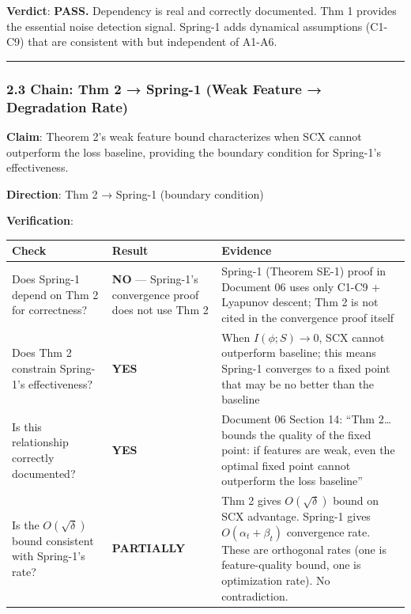 \documentclass[
  12pt,
]{article}
\begin{document}
\textbf{Verdict}: \textbf{PASS.} Dependency is real and correctly
documented. Thm 1 provides the essential noise detection signal.
Spring-1 adds dynamical assumptions (C1-C9) that are consistent with but
independent of A1-A6.

\begin{center}\rule{0.5\linewidth}{0.5pt}\end{center}

\subsubsection{2.3 Chain: Thm 2 → Spring-1 (Weak Feature → Degradation
Rate)}\label{chain-thm-2-spring-1-weak-feature-degradation-rate}

\textbf{Claim}: Theorem 2's weak feature bound characterizes when SCX
cannot outperform the loss baseline, providing the boundary condition
for Spring-1's effectiveness.

\textbf{Direction}: Thm 2 → Spring-1 (boundary condition)

\textbf{Verification}:

\begin{longtable}[]{@{}
  >{\raggedright\arraybackslash}p{}
  >{\raggedright\arraybackslash}p{}
  >{\raggedright\arraybackslash}p{}@{}}
\toprule\noalign{}
\begin{minipage}[b]{\linewidth}\raggedright
Check
\end{minipage} & \begin{minipage}[b]{\linewidth}\raggedright
Result
\end{minipage} & \begin{minipage}[b]{\linewidth}\raggedright
Evidence
\end{minipage} \\
\midrule\noalign{}
\endhead
\bottomrule\noalign{}
\endlastfoot
Does Spring-1 depend on Thm 2 for correctness? & \textbf{NO} ---
Spring-1's convergence proof does not use Thm 2 & Spring-1 (Theorem
SE-1) proof in Document 06 uses only C1-C9 + Lyapunov descent; Thm 2 is
not cited in the convergence proof itself \\
Does Thm 2 constrain Spring-1's effectiveness? & \textbf{YES} & When
\(I(\phi; S) \to 0\), SCX cannot outperform baseline; this means
Spring-1 converges to a fixed point that may be no better than the
baseline \\
Is this relationship correctly documented? & \textbf{YES} & Document 06
Section 14: ``Thm 2\ldots bounds the quality of the fixed point: if
features are weak, even the optimal fixed point cannot outperform the
loss baseline'' \\
Is the \(O(\sqrt{\delta})\) bound consistent with Spring-1's rate? &
\textbf{PARTIALLY} & Thm 2 gives \(O(\sqrt{\delta})\) bound on SCX
advantage. Spring-1 gives \(O(\alpha_t + \beta_t)\) convergence rate.
These are orthogonal rates (one is feature-quality bound, one is
optimization rate). No contradiction. \\
\end{longtable}
\end{document}
